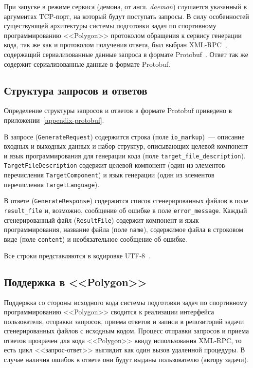 \documentclass[times,specification,annotation]{style/itmo-student-thesis/itmo-student-thesis}
\begin{document}
При запуске в режиме сервиса (демона, от англ. \textit{daemon}) слушается указанный в аргументах TCP-порт, на который будут поступать запросы. В силу особенностей существующей архитектуры системы подготовки задач по спортивному программированию <<Polygon>> протоколом обращения к сервису генерации кода, так же как и протоколом получения ответа, был выбран XML-RPC~\cite{laurent2001programming}, содержащий сериализованные данные запроса в формате Protobuf~\cite{protobufdocs}. Ответ так же содержит сериализованные данные в формате Protobuf.

\subsection{Структура запросов и ответов}

Определение структуры запросов и ответов в формате Protobuf приведено в приложении~\ref{appendix-protobuf}.

В запросе (\texttt{GenerateRequest}) содержится строка (поле \texttt{io\_markup})~--- описание входных и выходных данных и набор структур, описывающих целевой компонент и язык программирования для генерации кода (поле \texttt{target\_file\_description}). \texttt{TargetFileDescription} содержит целевой компонент (один из элементов перечисления \texttt{TargetComponent}) и язык генерации (один из элементов перечисления \texttt{TargetLanguage}).

В ответе (\texttt{GenerateResponse}) содержится список сгенерированных файлов в поле \texttt{result\_file} и, возможно, сообщение об ошибке в поле \texttt{error\_message}. Каждый сгенерированный файл (\texttt{ResultFile}) содержит компонент и язык программирования, название файла (поле \texttt{name}), содержимое файла в строковом виде (поле \texttt{content}) и необязательное сообщение об ошибке.

Все строки представляются в кодировке UTF-8~\cite{allen2012unicode}.

\subsection{Поддержка в <<Polygon>>}

Поддержка со стороны исходного кода системы подготовки задач по спортивному программированию <<Polygon>> сводится к реализации интерфейса пользователя, отправки запросов, приема ответов и записи в репозиторий задачи сгенерированных файлов с исходным кодом. Процесс отправки запросов и приема ответов прозрачен для кода <<Polygon>> ввиду использования XML-RPC, то есть цикл <<запрос-ответ>> выглядит как один вызов удаленной процедуры. В случае наличия ошибок в ответе они будут выданы пользователю (автору задачи).
\end{document}
